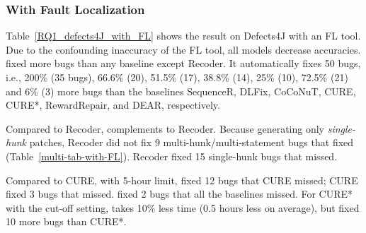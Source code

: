 \subsubsection{{\bf With Fault Localization}}

Table~\ref{RQ1_defects4J_with_FL} shows the result on Defects4J with
an FL tool. Due to the confounding inaccuracy of the FL tool, all
models decrease accuracies. {\tool} fixed more bugs than any baseline
except Recoder. It automatically fixes 50 bugs, i.e., 200\% (35 bugs),
66.6\% (20), 51.5\% (17), 38.8\% (14), 25\% (10), 72.5\% (21) and
6\% (3) more bugs than the baselines SequenceR, DLFix, CoCoNuT, CURE,
CURE*, RewardRepair, and DEAR, respectively.

Compared to Recoder, {\tool} complements to Recoder.  Because
generating only {\em single-hunk} patches, Recoder did not fix 9
multi-hunk/multi-statement bugs that {\tool} fixed
(Table~\ref{multi-tab-with-FL}). Recoder fixed 15 single-hunk bugs that {\tool} missed.

Compared to CURE, with 5-hour limit, {\tool} fixed 12 bugs that CURE
missed; CURE fixed 3 bugs that {\tool} missed. {\tool} fixed
2 bugs that all the baselines missed. For CURE* with the
cut-off setting, {\tool} takes 10\% less time (0.5 hours less on
average), but fixed 10 more bugs than CURE*.




%






